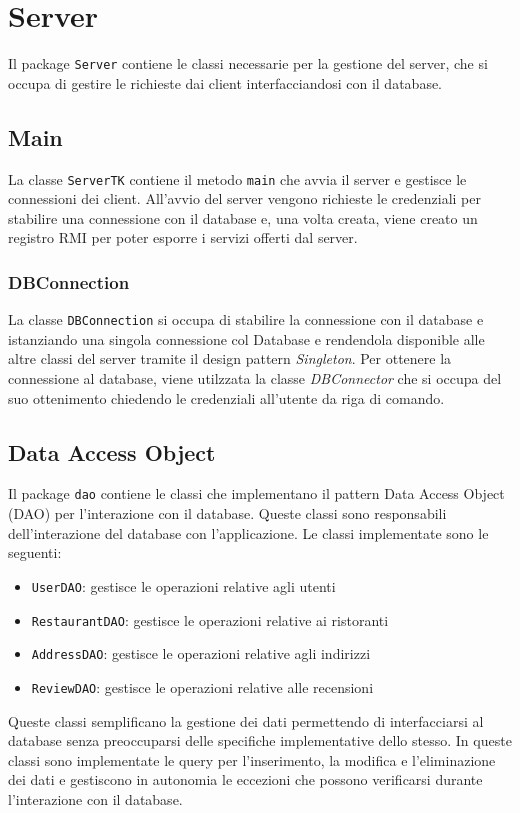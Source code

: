 \section{Server}
Il package \texttt{Server} contiene le classi necessarie per 
la gestione del server, che si occupa di gestire le richieste 
dai client interfacciandosi con il database.

\subsection{Main}
La classe \texttt{ServerTK} contiene il metodo \texttt{main} 
che avvia il server e gestisce le connessioni dei client.
All'avvio del server vengono richieste le credenziali per stabilire 
una connessione con il database e, una volta creata, viene creato un 
registro RMI per poter esporre i servizi offerti dal server.

\subsubsection{DBConnection}
La classe \texttt{DBConnection} si occupa di stabilire
la connessione con il database e 
istanziando una singola connessione col Database e rendendola disponible 
alle altre classi del server tramite il design pattern \textit{Singleton}.
Per ottenere la connessione al database, viene utilzzata la classe 
\textit{DBConnector} che si occupa del suo ottenimento
chiedendo le credenziali all'utente da riga di comando.


\subsection{Data Access Object}
Il package \texttt{dao} contiene le classi che implementano 
il pattern Data Access Object (DAO) per l'interazione
con il database. Queste classi sono responsabili dell'interazione 
del database con l'applicazione.
Le classi implementate sono le seguenti:
\begin{itemize}
    \item \texttt{UserDAO}: gestisce le operazioni relative agli utenti
    \item \texttt{RestaurantDAO}: gestisce le operazioni relative ai ristoranti
    \item \texttt{AddressDAO}: gestisce le operazioni relative agli indirizzi
    \item \texttt{ReviewDAO}: gestisce le operazioni relative alle recensioni
\end{itemize}
Queste classi semplificano la gestione dei dati permettendo 
di interfacciarsi al database senza preoccuparsi delle specifiche
implementative dello stesso. 
In queste classi sono implementate le query per l'inserimento, 
la modifica e l'eliminazione dei dati e gestiscono in autonomia 
le eccezioni che possono verificarsi durante l'interazione
con il database.

